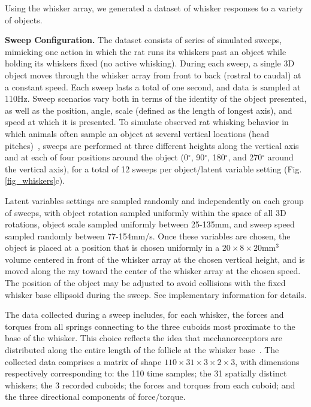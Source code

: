 Using the whisker array, we generated a dataset of whisker responses to a variety of objects.   

\textbf{Sweep Configuration.}  The dataset consists of series of simulated sweeps, mimicking one action in which the rat runs its whiskers past an object while holding its whiskers fixed (no active whisking).   
During each sweep, a single 3D object moves through the whisker array from front to back (rostral to caudal) at a constant speed.  
Each sweep lasts a total of one second, and data is sampled at 110Hz. 
Sweep scenarios vary both in terms of the identity of the object presented, as well as the position, angle, scale (defined as the length of longest axis), and speed at which it is presented.   
To simulate observed rat whisking behavior in which animals often sample an object at several vertical locations (head pitches)~\cite{hobbs2015spatiotemporal}, sweeps are performed at three different heights along the vertical axis and at each of four positions around the object (0$^{\circ}$, 90$^{\circ}$, 180$^{\circ}$, and 270$^{\circ}$ around the vertical axis), for a total of 12 sweeps per object/latent variable setting (Fig. \ref{fig_whiskers}c). 

Latent variables settings are sampled randomly and independently on each group of sweeps, with object rotation sampled uniformly within the space of all 3D rotations, object scale sampled uniformly between 25-135mm, and sweep speed sampled randomly between 77-154mm/s.  
Once these variables are chosen, the object is placed at a position that is chosen uniformly in a  $20 \times 8 \times 20$mm$^{3}$ volume centered in front of the whisker array at the chosen vertical height, and is moved along the ray toward the center of the whisker array at the chosen speed. 
The position of the object may be adjusted to avoid collisions with the fixed whisker base ellipsoid during the sweep. See implementary information for details.

The data collected during a sweep includes, for each whisker, the forces and torques from all springs connecting to the three cuboids most proximate to the base of the whisker.  This choice reflects the idea that mechanoreceptors are distributed along the entire length of the follicle at the whisker base~\cite{ebara2002similarities}.  
The collected data comprises a matrix of shape $110 \times 31 \times 3 \times 2 \times 3$, with dimensions respectively corresponding to: the 110 time samples;  the 31 spatially distinct whiskers; the 3 recorded cuboids; the forces and torques from each cuboid; and the three directional components of force/torque.   

